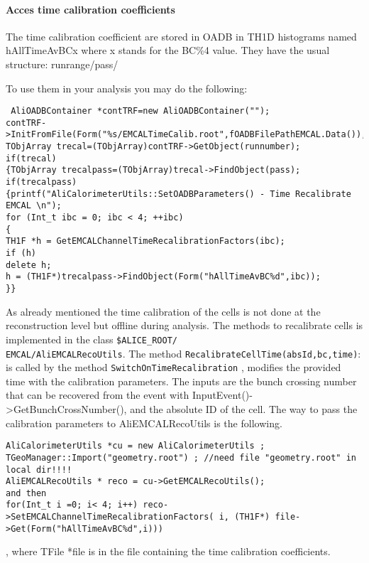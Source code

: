 \paragraph*{Acces time calibration coefficients\\}

The time calibration coefficient are stored in OADB in TH1D histograms named hAllTimeAvBCx where x stands for the BC$\%$4 value.
They have the usual structure:
runrange/pass/

To use them in your analysis you may do the following:\\
\begin{DDbox}{\linewidth}
\begin{lstlisting}
 AliOADBContainer *contTRF=new AliOADBContainer("");
contTRF->InitFromFile(Form("%s/EMCALTimeCalib.root",fOADBFilePathEMCAL.Data()),"AliEMCALTimeCalib");
TObjArray trecal=(TObjArray)contTRF->GetObject(runnumber);
if(trecal)
{TObjArray trecalpass=(TObjArray)trecal->FindObject(pass);
if(trecalpass)
{printf("AliCalorimeterUtils::SetOADBParameters() - Time Recalibrate EMCAL \n");
for (Int_t ibc = 0; ibc < 4; ++ibc)
{
TH1F *h = GetEMCALChannelTimeRecalibrationFactors(ibc);
if (h)
delete h;
h = (TH1F*)trecalpass->FindObject(Form("hAllTimeAvBC%d",ibc));
}}
\end{lstlisting}
\end{DDbox}

As already  mentioned the time calibration of the cells is not done at the reconstruction level but offline during analysis. The methods to recalibrate cells is implemented in the class 
\texttt{\$ALICE\_ROOT/\\EMCAL/AliEMCALRecoUtils}.
The method \texttt{RecalibrateCellTime(absId,bc,time)}: is called by the method \texttt{SwitchOnTimeRecalibration} , modifies the provided time with the calibration parameters. The inputs are the bunch crossing number that can be recovered from the event with InputEvent()->GetBunchCrossNumber(), and the absolute ID of the cell.
The way to pass  the calibration parameters to AliEMCALRecoUtils is the following.\\ 
\begin{DDbox}{\linewidth}
\begin{lstlisting}
AliCalorimeterUtils *cu = new AliCalorimeterUtils ;
TGeoManager::Import("geometry.root") ; //need file "geometry.root" in local dir!!!!
AliEMCALRecoUtils * reco = cu->GetEMCALRecoUtils();
and then 
for(Int_t i =0; i< 4; i++) reco->SetEMCALChannelTimeRecalibrationFactors( i, (TH1F*) file->Get(Form("hAllTimeAvBC%d",i)))
\end{lstlisting}
\end{DDbox}
, where TFile *file is in the file containing the time calibration coefficients.

